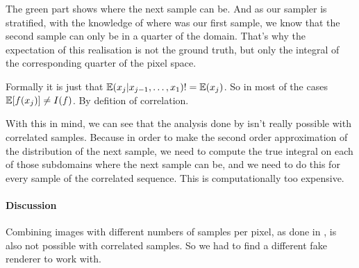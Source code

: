 \documentclass{classeENS}
\begin{document}
\begin{center}
\end{center}
The green part shows where the next sample can be. And as our sampler is stratified,
with the knowledge of where was our first sample, we know that the second sample can only
be in a quarter of the domain. That's why the expectation of this realisation is not the 
ground truth, but only the integral of the corresponding quarter of the pixel space.

\par Formally it is just that $\mathbb E(x_j | x_{j-1},\dots,x_1) != \mathbb E(x_j)$. So in
most of the cases $\mathbb E[f(x_j)] \neq I(f)$. By defition of correlation.

\par With this in mind, we can see that the analysis done by \cite{10.1145/3550454.3555515}
isn't really possible with correlated samples. Because in order to make the second order 
approximation of the distribution of the next sample, we need to compute the true integral on 
each of those subdomains where the next sample can be, and we need to do this for every sample 
of the correlated sequence. This is computationally too expensive.

\paragraph*{Discussion} Combining images with different numbers of samples per pixel, 
as done in \cite{kuznetsov2018deep}, is also not possible with correlated samples. 
So we had to find a different fake renderer to work with.
\end{document}
